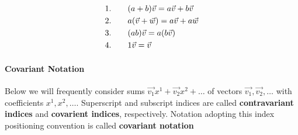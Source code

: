 \documentclass[11pt, oneside]{article}   	%
\begin{document}
\begin{align*}
&1. \hspace{20px}  (a+b)\vec{v} = a\vec{v}  + b\vec{v} \\
&2. \hspace{20px} a(\vec{v} + \vec{w}) = a\vec{v} + a\vec{w} \\
&3. \hspace{20px} (ab)\vec{v} = a(b\vec{v}) \\ 
&4. \hspace{20px} 1\vec{v} = \vec{v}  
\end{align*}

\paragraph{Covariant Notation}

Below we will frequently consider sums  $\vec{v_1}x^1 + \vec{v_2}x^2 + \dots
$ of vectors $\vec{v_1},\vec{v_2},\dots$ with coefficients $x^1,x^2,\dots$.
Superscript and subscript indices are called  \textbf{contravariant indices}
and \textbf{covarient indices}, respectively. Notation adopting this index
positioning convention is called \textbf{covariant notation}  
\end{document}
